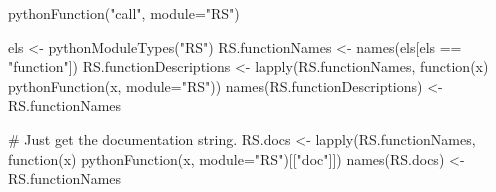 \begin{SeeAlso}\relax
{}\end{SeeAlso}
\begin{Examples}
\begin{ExampleCode}
 pythonFunction("call", module="RS")

 els <- pythonModuleTypes("RS")
 RS.functionNames <- names(els[els == "function"])
 RS.functionDescriptions <- lapply(RS.functionNames, function(x) pythonFunction(x, module="RS"))
 names(RS.functionDescriptions) <- RS.functionNames

 # Just get the documentation string.
 RS.docs <- lapply(RS.functionNames, function(x) pythonFunction(x, module="RS")[["doc"]])
 names(RS.docs) <- RS.functionNames
\end{ExampleCode}
\end{Examples}

